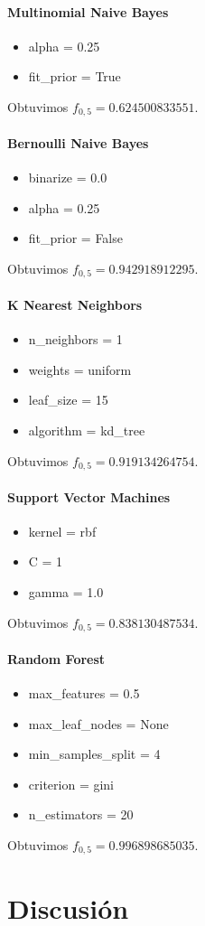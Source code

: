 \documentclass[hidelinks,a4paper,11pt, nofootinbib]{article}
\begin{document}
\paragraph{Multinomial Naive Bayes}
\begin{itemize}
 \item alpha = 0.25
 \item fit\_prior = True
\end{itemize}

Obtuvimos $f_{0,5} = 0.624500833551$.

\paragraph{Bernoulli Naive Bayes}
\begin{itemize}
 \item binarize = 0.0
 \item alpha = 0.25
 \item fit\_prior = False
\end{itemize}

Obtuvimos $f_{0,5} = 0.942918912295$.

\paragraph{K Nearest Neighbors}
\begin{itemize}
 \item n\_neighbors = 1
 \item weights = uniform
 \item leaf\_size = 15
 \item algorithm = kd\_tree
\end{itemize}

Obtuvimos $f_{0,5} = 0.919134264754$.

\paragraph{Support Vector Machines}
\begin{itemize}
 \item kernel = rbf
 \item C = 1
 \item gamma = 1.0
\end{itemize}

Obtuvimos $f_{0,5} = 0.838130487534$.

\paragraph{Random Forest}
\begin{itemize}
 \item max\_features = 0.5
 \item max\_leaf\_nodes = None
 \item min\_samples\_split = 4
 \item criterion = gini
 \item n\_estimators = 20
\end{itemize}

Obtuvimos $f_{0,5} = 0.996898685035$.

\section{Discusión}

\theendnotes
\end{document}
